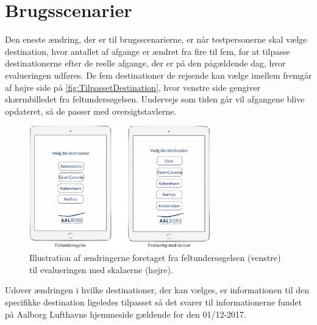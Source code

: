 \section{Brugsscenarier}
\label{TestAfSkalaBrugsscenarier}
%
Den eneste ændring, der er til brugsscenarierne, er når testpersonerne skal vælge destination, hvor antallet af afgange er ændret fra fire til fem, for at tilpasse destinationerne efter de reelle afgange, der er på den pågældende dag, hvor evalueringen udføres. De fem destinationer de rejsende kan vælge imellem fremgår af højre side på \autoref{fig:TilpassetDestination}, hvor venstre side gengiver skærmbilledet fra feltundersøgelsen. Undervejs som tiden går vil afgangene blive opdateret, så de passer med oversigtstavlerne.
%
\begin{figure}[H]
\centering
\includegraphics[width =0.7\textwidth]{Figure/TestdesignEvaluering/TilpassetDestination} 
\caption{Illustration af ændringerne foretaget fra feltundersøgelsen (venstre) til evalueringen med skalaerne (højre).}
\label{fig:TilpassetDestination}
\end{figure}
\noindent
%
Udover ændringen i hvilke destinationer, der kan vælges, er informationen til den specifikke destination ligeledes tilpasset så det svarer til informationerne fundet på Aalborg Lufthavns hjemmeside gældende for den 01/12-2017. 